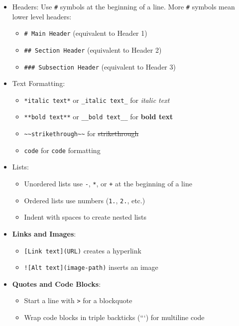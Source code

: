 \documentclass[
  letterpaper,
]{book}
\begin{document}
\begin{itemize}
\item
  Headers: Use \texttt{\#} symbols at the beginning of a line. More
  \texttt{\#} symbols mean lower level headers:

  \begin{itemize}
  \item
    \texttt{\#\ Main\ Header} (equivalent to Header 1)
  \item
    \texttt{\#\#\ Section\ Header} (equivalent to Header 2)
  \item
    \texttt{\#\#\#\ Subsection\ Header} (equivalent to Header 3)
  \end{itemize}
\item
  Text Formatting:

  \begin{itemize}
  \item
    \texttt{*italic\ text*} or \texttt{\_italic\ text\_} for
    \emph{italic text}
  \item
    \texttt{**bold\ text**} or \texttt{\_\_bold\ text\_\_} for
    \textbf{bold text}
  \item
    \texttt{\textasciitilde{}\textasciitilde{}strikethrough\textasciitilde{}\textasciitilde{}}
    for \st{strikethrough}
  \item
    \texttt{\textasciigrave{}code\textasciigrave{}} for \texttt{code}
    formatting
  \end{itemize}
\item
  Lists:

  \begin{itemize}
  \item
    Unordered lists use \texttt{-}, \texttt{*}, or \texttt{+} at the
    beginning of a line
  \item
    Ordered lists use numbers (\texttt{1.}, \texttt{2.}, etc.)
  \item
    Indent with spaces to create nested lists
  \end{itemize}
\item
  \textbf{Links and Images}:

  \begin{itemize}
  \item
    \texttt{{[}Link\ text{]}(URL)} creates a hyperlink
  \item
    \texttt{!{[}Alt\ text{]}(image-path)} inserts an image
  \end{itemize}
\item
  \textbf{Quotes and Code Blocks}:

  \begin{itemize}
  \item
    Start a line with \texttt{\textgreater{}} for a blockquote
  \item
    Wrap code blocks in triple backticks (```) for multiline code
  \end{itemize}
\end{itemize}
\end{document}
